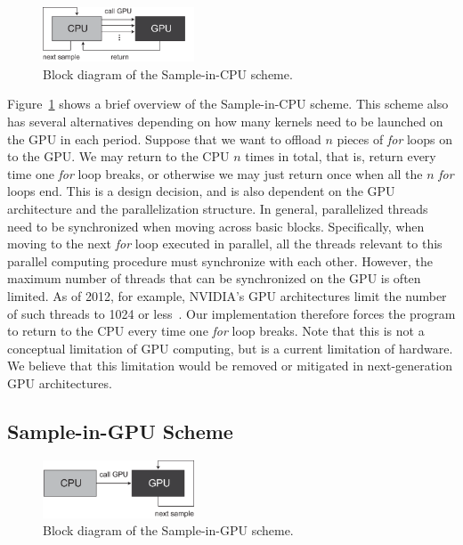 \documentclass[times, 10pt, twocolumn]{article}
\begin{document}
\begin{figure}[t]
\centering
\includegraphics[width=0.4\textwidth]{eps/sample-in-cpu.eps}
\caption{Block diagram of the Sample-in-CPU scheme.}
\label{fig:sample-in-cpu}
\end{figure}

Figure~\ref{fig:sample-in-cpu} shows a brief overview of the
Sample-in-CPU scheme.
This scheme also has several alternatives depending on how many kernels
need to be launched on the GPU in each period. 
Suppose that we want to offload $n$ pieces of \textit{for} loops on to
the GPU.
We may return to the CPU $n$ times in total, that is, return every time
one \textit{for} loop breaks, or otherwise we may just return once when
all the $n$ \textit{for} loops end.
This is a design decision, and is also dependent on the GPU architecture
and the parallelization structure.
In general, parallelized threads need to be synchronized when moving
across basic blocks.
Specifically, when moving to the next \textit{for} loop executed in
parallel, all the threads relevant to this parallel computing procedure
must synchronize with each other.
However, the maximum number of threads that can be synchronized on the
GPU is often limited.
As of 2012, for example, NVIDIA's GPU architectures limit the number of
such threads to 1024 or less~\cite{NVIDIA_Kepler}.
Our implementation therefore forces the program to return to the CPU
every time one \textit{for} loop breaks.
Note that this is not a conceptual limitation of GPU computing, but is a
current limitation of hardware.
We believe that this limitation would be removed or mitigated in
next-generation GPU architectures.

\subsection{Sample-in-GPU Scheme}
\label{sec:sample-in-gpu}

\begin{figure}[t]
\centering
\includegraphics[width=0.4\textwidth]{eps/sample-in-gpu.eps}
\caption{Block diagram of the Sample-in-GPU scheme.}
\label{fig:sample-in-gpu}
\end{figure}
\end{document}
